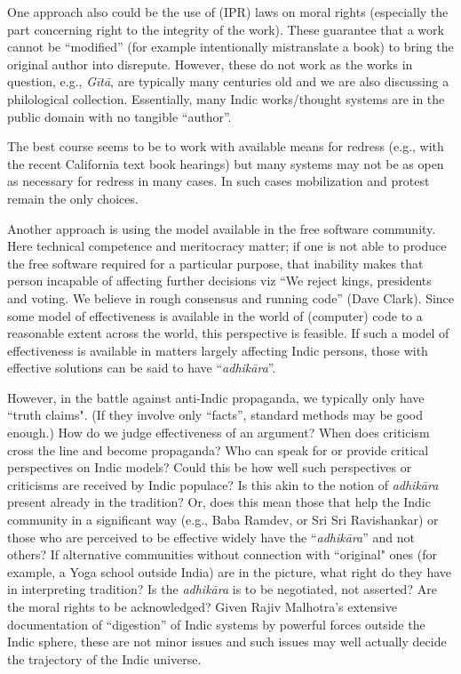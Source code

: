 One approach also could be the use of (IPR) laws on moral rights (especially the part concerning right to the integrity of the work). These guarantee that a work cannot be “modified” (for example intentionally mistranslate a book) to bring the original author into disrepute. However, these do not work as the works in question, e.g., {\sl Gītā}, are typically many centuries old and we are also discussing a philological collection. Essentially, many Indic works/thought systems are in the public domain with no tangible “author”.

The best course seems to be to work with available means for redress (e.g., with the recent California text book hearings) but many systems may not be as open as necessary for redress in many cases. In such cases mobilization and protest remain the only choices.

Another approach is using the model available in the free software community. Here technical competence and meritocracy matter; if one is not able to produce the free software required for a particular purpose, that inability makes that person incapable of affecting further decisions viz “We reject kings, presidents and voting. We believe in rough consensus and running code” (Dave Clark).  Since some model of effectiveness is available in the world of (computer) code to a reasonable extent across the world, this perspective is feasible. If such a model of effectiveness is available in matters largely affecting Indic persons, those with effective solutions can be said to have “{\sl adhikāra}”.

However, in the battle against anti-Indic propaganda, we typically only have ``truth claims". (If they involve only “facts”, standard methods may be good enough.) How do we judge effectiveness of an argument?  When does criticism cross the line and become propaganda? Who can speak for or provide critical perspectives on Indic models? Could this be how well such perspectives or criticisms are received by Indic populace? Is this akin to the notion of {\sl adhikāra} present already in the tradition? Or, does this mean those that help the Indic community in a significant way (e.g., Baba Ramdev, or Sri Sri Ravishankar) or those who are perceived to be effective widely have the “{\sl adhikāra}” and not others? If alternative communities without connection with ``original" ones (for example, a Yoga school outside India) are in the picture, what right do they have in interpreting tradition? Is the {\sl adhikāra} is to be negotiated, not asserted? Are the moral rights to be acknowledged? Given Rajiv Malhotra’s extensive documentation of “digestion” of Indic systems by powerful forces outside the Indic sphere, these are not minor issues and such issues may well actually decide the trajectory of the Indic universe.

